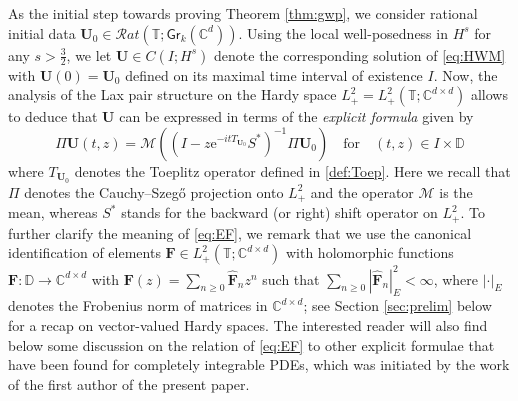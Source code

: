 \documentclass[10pt,reqno,a4paper]{amsart}
\theoremstyle{definition}
\theoremstyle{remark}
\theoremstyle{remark}
\numberwithin{equation}{section}
\newcommand{\C}{\mathbb{C}}
\newcommand{\T}{\mathbb{T}}
\newcommand{\D}{\mathbb{D}}
\newcommand{\Mean}{\mathscr{M}}
\newcommand{\be}{\begin{equation}}
\newcommand{\ee}{\end{equation}}
\newcommand{\eu}{\mathrm{e}}
\newcommand{\Ub}{\mathbf{U}}
\newcommand{\Fb}{\mathbf{F}}
\newcommand{\id}{I}
\newcommand{\Gr}{\mathsf{Gr}}
\begin{document}
As the initial step towards proving Theorem \ref{thm:gwp}, we consider rational initial data $\Ub_0 \in \mathcal{R}at(\T; \Gr_k(\C^d))$. Using the local well-posedness in $H^s$ for any $s > \frac 3 2$, we let $\Ub \in C(I; H^s)$ denote the corresponding solution of \eqref{eq:HWM} with $\Ub(0) = \Ub_0$ defined on its maximal time interval of existence $I$. Now, the analysis of the Lax pair structure on the Hardy space $L^2_+=L^2_+(\T; \C^{d \times d})$ allows to deduce that $\Ub$ can be expressed in terms of the {\em explicit formula} given by
\be \tag{EF} \label{eq:EF}
\boxed{\Pi \Ub(t,z) = \Mean \left ( ( \id - z \eu^{-itT_{\Ub_0}} S^*)^{-1} \Pi \Ub_0 \right ) \quad \mbox{for} \quad (t,z)  \in I \times \D}
\ee
where $T_{\Ub_0}$ denotes the Toeplitz operator defined in \eqref{def:Toep}. Here we recall that $\Pi$ denotes the Cauchy--Szeg\H{o} projection onto $L^2_+$ and the operator $\Mean$ is the mean, whereas $S^*$ stands for the backward (or right) shift operator on $L^2_+$. To further clarify the meaning of \eqref{eq:EF}, we remark that we use the canonical identification of elements $\Fb \in L^2_+(\T; \C^{d \times d})$ with holomorphic functions $\Fb : \D \to \C^{d \times d}$ with $\Fb(z) = \sum_{n \geq 0} \widehat{\Fb}_n z^n$ such that $\sum_{n \geq 0}|\widehat{\Fb}_n|_E^2 < \infty$, where $|\cdot|_E$ denotes the Frobenius norm of matrices in $\C^{d \times d}$; see Section \ref{sec:prelim} below for a recap on vector-valued Hardy spaces. The interested reader will also find  below some discussion on the relation of \eqref{eq:EF} to other explicit formulae that have been found for completely integrable PDEs, which was initiated by the work of the first author of the present paper.
\end{document}
